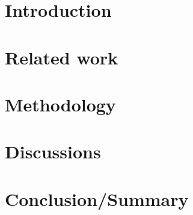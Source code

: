 \documentclass[MACS,english,a4paper,oneside]{ntnuthesis/ntnuthesis}
\begin{document}
	
	\makefrontpages %
	
	
	
	\tableofcontents
	
	\hypersetup{pageanchor=true}
	
	\listoffigures
	\listoftables
	
	
	\chapter{Introduction}
	 
	
	\chapter{Related work}
	 
	
	\chapter{Methodology}
	 
	
%	 
	
	\chapter{Discussions}
	 
	
	\chapter{Conclusion/Summary}
	 
	
	\clearpage
	\printbibliography
	
\begin{comment}
	\ifthenelse{\boolean{HarvardCitations}}{%
	}{%
	}
		
\end{comment}
	
	
\end{document}
